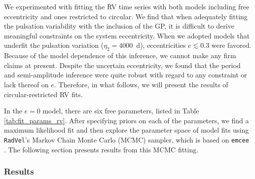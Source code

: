 \documentclass[twocolumn]{aastex631}
\begin{document}
We experimented with fitting the RV time series with both models including free eccentricity and ones restricted to circular. We find that when adequately fitting the pulsation variability with the inclusion of the GP, it is difficult to derive meaningful constraints on the system eccentricity. When we adopted models that underfit the pulsation variation ($\eta_2 = 4000$~d), eccentricities $e\lesssim 0.3$ were favored. Because of the model dependence of this inference, we cannot make any firm claims at present.  Despite the uncertain eccentricity, we found that the period and semi-amplitude inference were quite robust with regard to any constraint or lack thereof on $e$. Therefore, in what follows, we will  present the results of  circular-restricted RV fits. 

In the $e=0$ model, there are six free parameters, listed in Table \ref{tab:fit_params_rv}. 
After specifying priors on each of the  parameters, we find a maximum likelihood fit and then explore the parameter space of model fits using {\tt RadVel}'s Markov Chain Monte Carlo (MCMC) sampler, which is based on {\tt emcee} \citep{2013PASP..125..306F}. The following section presents results from this MCMC fitting. 


\subsubsection{Results}
\end{document}
